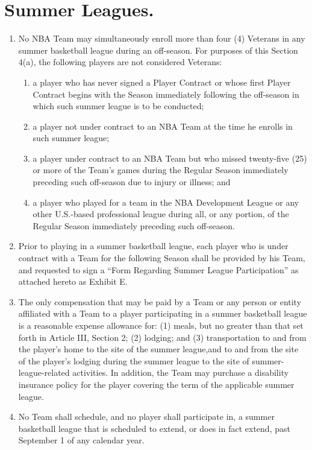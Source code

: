 \documentclass[
]{book}
\providecommand{\tightlist}{%
  \setlength{\itemsep}{0pt}\setlength{\parskip}{0pt}}
\begin{document}
\hypertarget{summer-leagues.}{%
\section{Summer Leagues.}\label{summer-leagues.}}

\begin{enumerate}
\def\labelenumi{(\alph{enumi})}
\tightlist
\item
  No NBA Team may simultaneously enroll more than four (4) Veterans in any summer basketball league during an off-season. For purposes of this Section 4(a), the following players are not considered Veterans:

  \begin{enumerate}
  \def\labelenumii{(\arabic{enumii})}
  \tightlist
  \item
    a player who has never signed a Player Contract or whose first Player Contract begins with the Season immediately following the off-season in which such summer league is to be conducted;
  \item
    a player not under contract to an NBA Team at the time he enrolls in such summer league;
  \item
    a player under contract to an NBA Team but who missed twenty-five (25) or more of the Team's games during the Regular Season immediately preceding such off-season due to injury or illness; and
  \item
    a player who played for a team in the NBA Development League or any other U.S.-based professional league during all, or any portion, of the Regular Season immediately preceding such off-season.
  \end{enumerate}
\item
  Prior to playing in a summer basketball league, each player who is under contract with a Team for the following Season shall be provided by his Team, and requested to sign a ``Form Regarding Summer League Participation'' as attached hereto as Exhibit E.
\item
  The only compensation that may be paid by a Team or any person or entity affiliated with a Team to a player participating in a summer basketball league is a reasonable expense allowance for: (1) meals, but no greater than that set forth in Article III, Section 2; (2) lodging; and (3) transportation to and from the player's home to the site of the summer league,and to and from the site of the player's lodging during the summer league to the site of summer-league-related activities. In addition, the Team may purchase a disability insurance policy for the player covering the term of the applicable summer league.
\item
  No Team shall schedule, and no player shall participate in, a summer basketball league that is scheduled to extend, or does in fact extend, past September 1 of any calendar year.
\end{enumerate}
\end{document}
